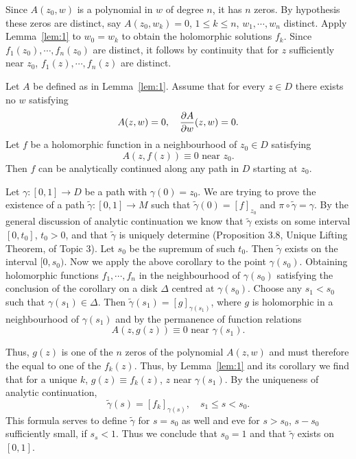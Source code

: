 \documentclass[a4paper,11pt]{article}
\begin{document}
\begin{myproof}
  Since $A(z_0, w)$ is a polynomial in $w$ of degree $n$, it has $n$
  zeros.  By hypothesis these zeros are distinct, say $A(z_0, w_k) =
  0$, $1 \le k \le n$, $w_1, \cdots, w_n$ distinct.  Apply
  Lemma~\ref{lem:1} to $w_0 = w_k$ to obtain the holomorphic solutions
  $f_k$.  Since $f_1(z_0), \cdots, f_n(z_0)$ are distinct, it follows
  by continuity that for $z$ sufficiently near $z_0$, $f_1(z), \cdots,
  f_n(z)$ are distinct.
\end{myproof}

\begin{lem}
  \label{lem:2}
  Let $A$ be defined as in Lemma~\ref{lem:1}.  Assume that for every
  $z \in D$ there exists no $w$ satisfying
  $$
  A(z,w) = 0,\quad \frac{\partial A}{\partial w}(z,w) = 0.
  $$
  Let $f$ be a holomorphic function in a neighbourhood of $z_0 \in D$
  satisfying
  $$
  A(z,f(z)) \equiv 0 \text{ near } z_0.
  $$
  Then $f$ can be analytically continued along any path in $D$
  starting at $z_0$.
\end{lem}

\begin{myproof}
  Let $\gamma : [0,1] \to D$ be a path with $\gamma(0) = z_0$.  We are
  trying to prove the existence of a path $\widetilde{\gamma} : [0,1]
  \to M$ such that $\widetilde{\gamma}(0) = [f]_{z_0}$ and $\pi \circ
  \widetilde{\gamma} = \gamma$.  By the general discussion of analytic
  continuation we know that $\widetilde{\gamma}$ exists on some
  interval $[0,t_0]$, $t_0 > 0$, and that $\widetilde{\gamma}$ is
  uniquely determine (Proposition 3.8, Unique Lifting Theorem, of
  Topic 3).  Let $s_0$ be the supremum of such $t_0$.  Then
  $\widetilde{\gamma}$ exists on the interval $[0,s_0)$.  Now we apply
  the above corollary to the point $\gamma(s_0)$.  Obtaining
  holomorphic functions $f_1, \cdots, f_n$ in the neighbourhood of
  $\gamma(s_0)$ satisfying the conclusion of the corollary on a disk
  $\Delta$ centred at $\gamma(s_0)$.  Choose any $s_1 < s_0$ such that
  $\gamma(s_1) \in \Delta$.  Then $\widetilde{\gamma}(s_1) =
  [g]_{\gamma(s_1)}$, where $g$ is holomorphic in a neighbourhood of
  $\gamma(s_1)$ and by the permanence of function relations
  $$
  A(z,g(z)) \equiv 0 \text{ near }\gamma(s_1).
  $$

  \begin{mdframed}
    \vspace{3cm}
  \end{mdframed}

  \noindent
  Thus, $g(z)$ is one of the $n$ zeros of the polynomial $A(z,w)$ and
  must therefore the equal to one of the $f_k(z)$.  Thus, by
  Lemma~\ref{lem:1} and its corollary we find that for a unique $k$,
  $g(z) \equiv f_k(z)$, $z$ near $\gamma(s_1)$.  By the uniqueness of
  analytic continuation,
  $$
  \widetilde{\gamma}(s) = [f_k]_{\gamma(s)},\quad
  s_1 \le s < s_0.
  $$
  This formula serves to define $\widetilde{\gamma}$ for $s = s_0$ as
  well and eve for $s>s_0$, $s-s_0$ sufficiently small, if $s_s < 1$.
  Thus we conclude that $s_0 = 1$ and that $\widetilde{\gamma}$ exists
  on $[0,1]$.
\end{myproof}
\end{document}
